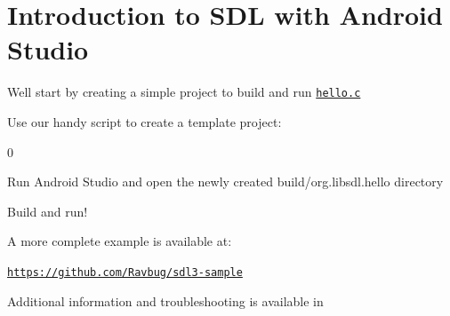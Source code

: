 \chapter{Introduction to SDL with Android Studio }
\hypertarget{md__mono_runtime_2extern_2sdl_2docs_2_i_n_t_r_o-androidstudio}{}\label{md__mono_runtime_2extern_2sdl_2docs_2_i_n_t_r_o-androidstudio}
\label{md__mono_runtime_2extern_2sdl_2docs_2_i_n_t_r_o-androidstudio_autotoc_md1163}%
%


We\textquotesingle{}ll start by creating a simple project to build and run \href{hello.c}{\texttt{hello.\+c}}


\begin{DoxyItemize}
\item Use our handy script to create a template project:\+ 
\begin{DoxyCode}{0}

\end{DoxyCode}

\item Run Android Studio and open the newly created build/\+org.\+libsdl.\+hello directory
\item Build and run!
\end{DoxyItemize}

A more complete example is available at:\+

\href{https://github.com/Ravbug/sdl3-sample}{\texttt{https:\+/\+/\+github.\+com/\+\+Ravbug/\+sdl3-\/sample}}

Additional information and troubleshooting is available in  